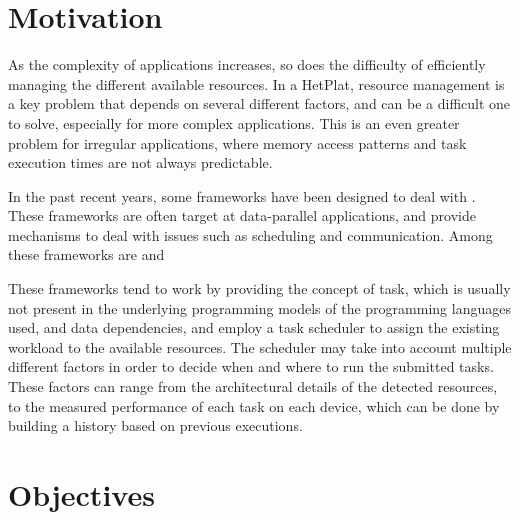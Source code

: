 \documentclass[main.tex]{subfiles}
\begin{document}
\section{Motivation}


As the complexity of applications increases, so does the difficulty of efficiently managing the different available resources. In a \ac{HetPlat}, resource management is a key problem that depends on several different factors, and can be a difficult one to solve, especially for more complex applications. This is an even greater problem for irregular applications, where memory access patterns and task execution times are not always predictable.

In the past recent years, some frameworks have been designed to deal with \hetplats. These frameworks are often target at data-parallel applications, and provide mechanisms to deal with issues such as scheduling and communication. Among these frameworks are \gama and \starpu {}

These frameworks tend to work by providing the concept of task, which is usually not present in the underlying programming models of the programming languages used, and data dependencies, and employ a task scheduler to assign the existing workload to the available resources.
The scheduler may take into account multiple different factors in order to decide when and where to run the submitted tasks. These factors can range from the architectural details of the detected resources, to the measured performance of each task on each device, which can be done by building a history based on previous executions.

\section{Objectives}

\end{document}
